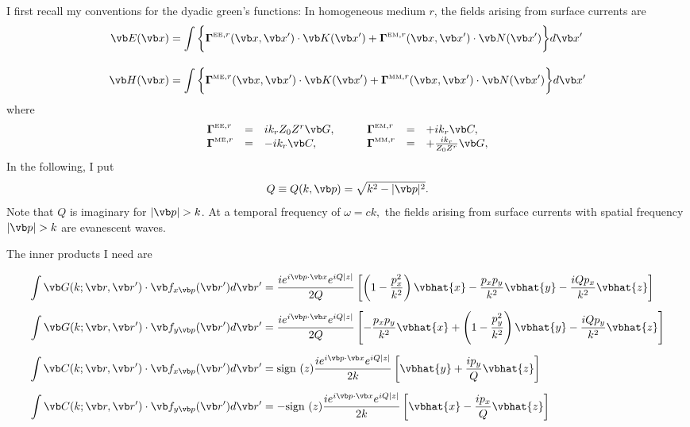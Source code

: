 \documentclass{article}
\newcommand{\BG}{\boldsymbol{\Gamma}}
\begin{document}
I first recall my conventions for the dyadic green's functions: In homogeneous
medium $r$, the fields arising from surface currents are
\begin{align*}
    \vb E(\vb x) 
&= \int\bigg\{ 
   \BG^{\text{\tiny{EE}},r}(\vb x, \vb x^\prime) 
   \cdot 
   \vb K(\vb x^\prime) 
  +\BG^{\text{\tiny{EM}},r}(\vb x, \vb x^\prime) 
   \cdot 
   \vb N(\vb x^\prime) \bigg\} d\vb x^\prime
\\[10pt]
    \vb H(\vb x) 
&= \int\bigg\{ 
   \BG^{\text{\tiny{ME}},r}(\vb x, \vb x^\prime) 
   \cdot 
   \vb K(\vb x^\prime) 
  +\BG^{\text{\tiny{MM}},r}(\vb x, \vb x^\prime) 
   \cdot 
   \vb N(\vb x^\prime) \bigg\} d\vb x^\prime
\end{align*}
where 
$$\begin{array}{lcllcl}
 \BG^{\text{\tiny{EE}},r}
 &=&ik_r Z_0 Z^r \vb G, 
 \qquad 
 &\BG^{\text{\tiny{EM}},r}
 &=&+ik_r \vb C, 
\\
 \BG^{\text{\tiny{ME}},r}
 &=&-ik_r \vb C, 
 \qquad 
 &\BG^{\text{\tiny{MM}},r}
 &=&+\frac{ik_r}{Z_0Z^r} \vb G, 
\\
\end{array}$$
In the following, I put 
$$ Q \equiv Q(k,\vb p) = \sqrt{k^2 - |\vb p|^2}.$$
Note that $Q$ is imaginary for $|\vb p|>k$. At a temporal
frequency of $\omega=ck,$ the fields arising from surface 
currents with spatial frequency $|\vb p|>k$ are evanescent 
waves.

The inner products I need are 

\begin{align*}
 \int \vb G(k; \vb r, \vb r^\prime) \cdot \vb f_{x\vb p}(\vb r^\prime)
d\vb r^\prime
&=\frac{ ie^{i\vb p \cdot \vb x} e^{iQ|z|}}{2Q}
       \left[   \left(1-\frac{p_x^2}{k^2}\right) \vbhat{x}
               -\frac{p_x p_y}{k^2} \vbhat{y}
               -\frac{iQ p_x}{k^2} \vbhat{z}
       \right]
\\[5pt]
 \int \vb G(k; \vb r, \vb r^\prime) \cdot \vb f_{y\vb p}(\vb r^\prime)
d\vb r^\prime
&=\frac{ ie^{i\vb p \cdot \vb x} e^{iQ|z|}}{2Q}
       \left[  -\frac{p_x p_y}{k^2} \vbhat{x}
               +\left(1-\frac{p_y^2}{k^2} \right) \vbhat{y}  
               -\frac{iQ p_y}{k^2} \vbhat{z}
       \right]
\\[5pt]
 \int \vb C(k; \vb r, \vb r^\prime) \cdot \vb f_{x\vb p}(\vb r^\prime)
d\vb r^\prime
&=   \text{sign }(z)
   \frac{ ie^{i\vb p \cdot \vb x} e^{iQ|z|}}{2k}
   \left[ \vbhat{y} + \frac{ip_y}{Q} \vbhat{z} \right]
\\[5pt]
 \int \vb C(k; \vb r, \vb r^\prime) \cdot \vb f_{y\vb p}(\vb r^\prime)
d\vb r^\prime
&= - \text{sign }(z)
   \frac{ ie^{i\vb p \cdot \vb x} e^{iQ|z|}}{2k}
   \left[ \vbhat{x} - \frac{ip_x}{Q} \vbhat{z} \right]
\end{align*}
\end{document}
